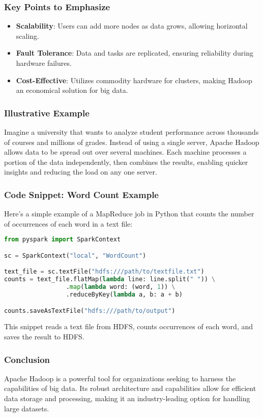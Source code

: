 \documentclass{beamer}
\begin{document}
\begin{frame}[fragile]
    \frametitle{Key Points to Emphasize}
    \begin{itemize}
        \item \textbf{Scalability}: Users can add more nodes as data grows, allowing horizontal scaling.
        \item \textbf{Fault Tolerance}: Data and tasks are replicated, ensuring reliability during hardware failures.
        \item \textbf{Cost-Effective}: Utilizes commodity hardware for clusters, making Hadoop an economical solution for big data.
    \end{itemize}
\end{frame}

\begin{frame}[fragile]
    \frametitle{Illustrative Example}
    Imagine a university that wants to analyze student performance across thousands of courses and millions of grades. Instead of using a single server, Apache Hadoop allows data to be spread out over several machines. Each machine processes a portion of the data independently, then combines the results, enabling quicker insights and reducing the load on any one server.
\end{frame}

\begin{frame}[fragile]
    \frametitle{Code Snippet: Word Count Example}
    Here’s a simple example of a MapReduce job in Python that counts the number of occurrences of each word in a text file:
    \begin{lstlisting}[language=Python]
from pyspark import SparkContext

sc = SparkContext("local", "WordCount")

text_file = sc.textFile("hdfs:///path/to/textfile.txt")
counts = text_file.flatMap(lambda line: line.split(" ")) \
                 .map(lambda word: (word, 1)) \
                 .reduceByKey(lambda a, b: a + b)

counts.saveAsTextFile("hdfs:///path/to/output")
    \end{lstlisting}
    This snippet reads a text file from HDFS, counts occurrences of each word, and saves the result to HDFS.
\end{frame}

\begin{frame}[fragile]
    \frametitle{Conclusion}
    Apache Hadoop is a powerful tool for organizations seeking to harness the capabilities of big data. Its robust architecture and capabilities allow for efficient data storage and processing, making it an industry-leading option for handling large datasets.
\end{frame}
\end{document}
